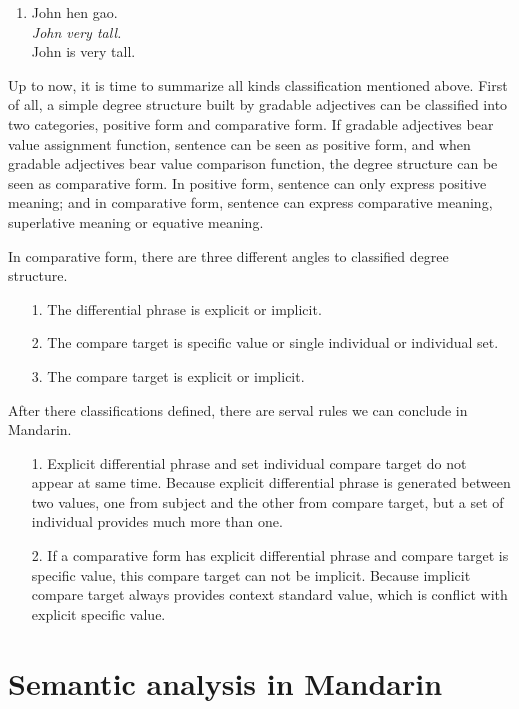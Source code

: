 \documentclass{ctexart}
\begin{document}
\begin{enumerate}[resume]
    \item \label{diff_tradition_comparative_example}
    John hen gao. \\
    \textit{John very tall.} \\
    John is very tall.
\end{enumerate}

Up to now, it is time to summarize all kinds classification mentioned above. First of all, a simple degree structure built by gradable adjectives can be classified into two categories, positive form and comparative form. If gradable adjectives bear value assignment function, sentence can be seen as positive form, and when gradable adjectives bear value comparison function, the degree structure can be seen as comparative form. In positive form, sentence can only express positive meaning; and in comparative form, sentence can express comparative meaning, superlative meaning or equative meaning.

In comparative form, there are three different angles to classified degree structure. 

\begin{itemize}
    \item[1.] The differential phrase is explicit or implicit.
    \item[2.] The compare target is specific value or single individual or individual set.
    \item[3.] The compare target is explicit or implicit.
\end{itemize}

After there classifications defined, there are serval rules we can conclude in Mandarin.

\begin{itemize}
    \item[1.] Explicit differential phrase and set individual compare target do not appear at same time. Because explicit differential phrase is generated between two values, one from subject and the other from compare target, but a set of individual provides much more than one.
    \item[2.] If a comparative form has explicit differential phrase and compare target is specific value, this compare target can not be implicit. Because implicit compare target always provides context standard value, which is conflict with explicit specific value.
\end{itemize}

\section{Semantic analysis in Mandarin}
\end{document}
